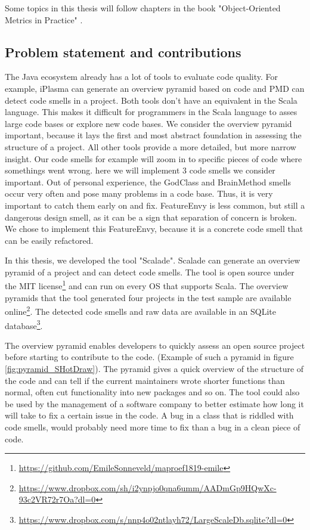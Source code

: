 \documentclass[onecolumn]{article}
\begin{document}
Some topics in this thesis will follow chapters in the book "Object-Oriented Metrics in Practice" \cite{lanza2007object}. 

\subsection{Problem statement and contributions}
The Java ecosystem already has a lot of tools to evaluate code quality. For example, iPlasma can generate an overview pyramid based on code and PMD can detect code smells in a project. Both tools don't have an equivalent in the Scala language. This makes it difficult for programmers in the Scala language to asses large code bases or explore new code bases. We consider the overview pyramid important, because it lays the first and most abstract foundation in assessing the structure of a project. All other tools provide a more detailed, but more narrow insight. Our code smells for example will zoom in to specific pieces of code where somethings went wrong. here we will implement 3 code smells we consider important. Out of personal experience, the GodClass and BrainMethod smells occur very often and pose many problems in a code base. Thus, it is very important to catch them early on and fix. FeatureEnvy is less common, but still a dangerous design smell, as it can be a sign that separation of concern is broken. We chose to implement this FeatureEnvy, because it is a concrete code smell that can be easily refactored.

In this thesis, we developed the tool "Scalade". Scalade can generate an overview pyramid of a project and can detect code smells. The tool is open source under the MIT license\footnote{\url{https://github.com/EmileSonneveld/maproef1819-emile}} and can run on every OS that supports Scala.
The overview pyramids that the tool generated four projects in the test sample are available online\footnote{\url{https://www.dropbox.com/sh/i2ynpjo0qna6umm/AADmGp9HQwXc-93c2VR72r7Oa?dl=0}}.
The detected code smells and raw data are available in an SQLite database\footnote{\url{https://www.dropbox.com/s/nnp4o02ntlayh72/LargeScaleDb.sqlite?dl=0}}.


The overview pyramid enables developers to quickly assess an open source project before starting to contribute to the code. (Example of such a pyramid in figure \ref{fig:pyramid_SHotDraw}). The pyramid gives a quick overview of the structure of the code and can tell if the current maintainers wrote shorter functions than normal, often cut functionality into new packages and so on. The tool could also be used by the management of a software company to better estimate how long it will take to fix a certain issue in the code. A bug in a class that is riddled with code smells, would probably need more time to fix than a bug in a clean piece of code.
\end{document}
